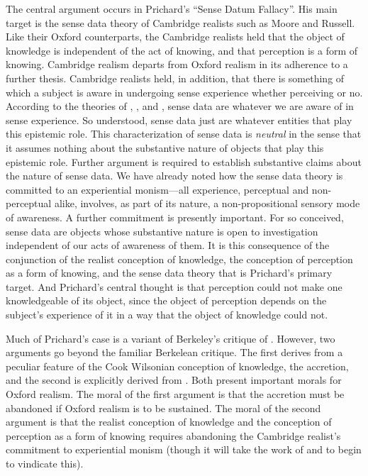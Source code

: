 The central argument occurs in Prichard's \citeyearpar{Prichard:1938ve} ``Sense Datum Fallacy''. His main target is the sense data theory of Cambridge realists such as Moore and Russell. Like their Oxford counterparts, the Cambridge realists held that the object of knowledge is independent of the act of knowing, and that perception is a form of knowing. Cambridge realism departs from Oxford realism in its adherence to a further thesis. Cambridge realists held, in addition, that there is something of which a subject is aware in undergoing sense experience whether perceiving or no. According to the theories of \citet{Moore:1953nx}, \citet{Russell:1912uq}, and \citet{Price:1932fk}, sense data are whatever we are aware of in sense experience. So understood, sense data just are whatever entities that play this epistemic role. This characterization of sense data is \emph{neutral} in the sense that it assumes nothing about the substantive nature of objects that play this epistemic role. Further argument is required to establish substantive claims about the nature of sense data. We have already noted how the sense data theory is committed to an experiential monism---all experience, perceptual and non-perceptual alike, involves, as part of its nature, a non-propositional sensory mode of awareness. A further commitment is presently important. For so conceived, sense data are objects whose substantive nature is open to investigation independent of our acts of awareness of them. It is this consequence of the conjunction of the realist conception of knowledge, the conception of perception as a form of knowing, and the sense data theory that is Prichard's primary target. And Prichard's central thought is that perception could not make one knowledgeable of its object, since the object of perception depends on the subject's experience of it in a way that the object of knowledge could not.

Much of Prichard's case is a variant of Berkeley's \citeyearpar{Berkeley:1734fk,Berkeley:1734zp} critique of \citet{Locke1690An-Essay-Concer}. However, two arguments go beyond the familiar Berkelean critique. The first derives from a peculiar feature of the Cook Wilsonian conception of knowledge, the accretion, and the second is explicitly derived from \citet{Paul:1936kd}. Both present important morals for Oxford realism. The moral of the first argument is that the accretion must be abandoned if Oxford realism is to be sustained. The moral of the second argument is that the realist conception of knowledge and the conception of perception as a form of knowing requires abandoning the Cambridge realist's commitment to experiential monism (though it will take the work of \citet{Austin:1962lr} and \citet{Hinton:1973js} to begin to vindicate this).

